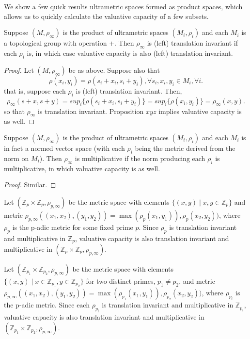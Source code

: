 We show a few quick results ultrametric spaces formed as product spaces, which allows us to quickly calculate the valuative capacity of a few subsets. 

\begin{proposition*}
Suppose $(M,\rho_\infty)$ is the product of ultrametric spaces $(M_i, \rho_i)$ and each $M_i$ is a topological group with operation $+$. Then $\rho_\infty$ is (left) translation invariant if each $\rho_i$ is, in which case valuative capacity is also (left) translation invariant.
\end{proposition*}

\begin{proof}
Let $(M,\rho_\infty)$ be as above. Suppose also that \[\rho(x_i,y_i) = \rho(s_i + x_i, s_i +y_i), \forall s_i, x_i, y_i \in M_i, \forall i.\] that is, suppose each $\rho_i$ is (left) translation invariant. Then,  
\[
\rho_\infty(s +x, s+y)  
= sup_i\{\rho(s_i +x_i, s_i + y_i)\} 
= sup_i\{\rho(x_i, y_i)\}
= \rho_\infty(x,y).
\] so that $\rho_\infty$ is translation invariant.  Proposition $xyz$ implies valuative capacity is as well. 
\end{proof}


\begin{proposition*}
Suppose $(M,\rho_\infty)$ is the product of ultrametric spaces $(M_i, \rho_i)$ and each $M_i$ is in fact a normed vector space (with each $\rho_i$ being the metric derived from the norm on $M_i$). Then $\rho_\infty$ is multiplicative if the norm producing each $\rho_i$ is multiplicative, in which valuative capacity is as well.
\end{proposition*}

\begin{proof}
Similar.
\end{proof}

\begin{example}
	Let $(\mathbb{Z}_p \times \mathbb{Z}_p, \rho_{p,\infty})$ be the metric space with elements $\{(x,y)\mid x,y \in \mathbb{Z}_p\}$ and metric $\rho_{p,\infty}((x_1,x_2), (y_1,y_2)) = \max(\rho_p(x_1, y_1)), \rho_p(x_2, y_2))$, where $\rho_p$ is the p-adic metric for some fixed prime $p$. Since $\rho_p$ is translation invariant and multiplicative in $\mathbb{Z}_p$, valuative capacity is also translation invariant and multiplicative in  $(\mathbb{Z}_p \times \mathbb{Z}_p, \rho_{p,\infty})$.
\end{example}

\begin{example}
	Let $(\mathbb{Z}_{p_1} \times \mathbb{Z}_{p_2}, \rho_{p,\infty})$ be the metric space with elements $\{(x,y)\mid x \in \mathbb{Z}_{p_1}, y \in \mathbb{Z}_{p_2}\}$ for two distinct primes, $p_1 \neq p_2$, and metric $\rho_{p,\infty}((x_1,x_2), (y_1,y_2)) = \max(\rho_{p_1}(x_1, y_1)), \rho_{p_2}(x_2, y_2))$, where $\rho_{p_i}$ is the p-adic metric. Since each $\rho_{p_i}$ is translation invariant and multiplicative in $\mathbb{Z}_{p_i}$, valuative capacity is also translation invariant and multiplicative in  $(\mathbb{Z}_{p_1} \times \mathbb{Z}_{p_2}, \rho_{p,\infty})$.
\end{example}


